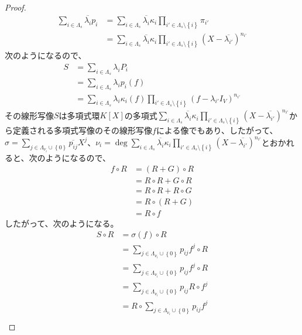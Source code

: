 \documentclass[dvipdfmx]{jsarticle}
\begin{document}
\begin{proof}
\begin{align*}
\sum_{i \in \varLambda_{s}} {\overline{\lambda_{i}}p_{i}} &= \sum_{i \in \varLambda_{s}} {\overline{\lambda_{i}}\kappa_{i}\prod_{i' \in \varLambda_{s} \setminus \left\{ i \right\}} {\pi_{i'}}} \\
&= \sum_{i \in \varLambda_{s}} {\overline{\lambda_{i}}\kappa_{i}\prod_{i' \in \varLambda_{s} \setminus \left\{ i \right\}} \left( X - \overline{\lambda_{i'}} \right)^{n_{i'}}}
\end{align*}
次のようになるので、
\begin{align*}
S &= \sum_{i \in \varLambda_{s}} {\lambda_{i}P_{i}} \\
&= \sum_{i \in \varLambda_{s}} {\lambda_{i}p_{i}(f)} \\
&= \sum_{i \in \varLambda_{s}} {\lambda_{i}\kappa_{i}(f)\prod_{i' \in \varLambda_{s} \setminus \left\{ i \right\}} \left( f - \lambda_{i'}I_{V} \right)^{n_{i'}}}
\end{align*}
その線形写像$S$は多項式環$K[X]$の多項式$\sum_{i \in \varLambda_{s}} {\overline{\lambda_{i}}\kappa_{i}\prod_{i' \in \varLambda_{s} \setminus \left\{ i \right\}} \left( X - \overline{\lambda_{i'}} \right)^{n_{i'}}}$から定義される多項式写像のその線形写像$f$による像でもあり、したがって、$\sigma = \sum_{j \in \varLambda_{\nu_{i}} \cup \left\{ 0 \right\}} {\overline{p_{ij}}X^{j}}$、$\nu_{i} = \deg{\sum_{i \in \varLambda_{s}} {\overline{\lambda_{i}}\kappa_{i}\prod_{i' \in \varLambda_{s} \setminus \left\{ i \right\}} \left( X - \overline{\lambda_{i'}} \right)^{n_{i'}}}}$とおかれると、次のようになるので、
\begin{align*}
f \circ R &= (R + G) \circ R \\
&= R \circ R + G \circ R \\
&= R \circ R + R \circ G \\
&= R \circ (R + G) \\
&= R \circ f
\end{align*}
したがって、次のようになる。
\begin{align*}
S \circ R &= \sigma(f) \circ R \\
&= \sum_{j \in \varLambda_{\nu_{i}} \cup \left\{ 0 \right\}} {p_{ij}f^{j}} \circ R \\
&= \sum_{j \in \varLambda_{\nu_{i}} \cup \left\{ 0 \right\}} {p_{ij}f^{j} \circ R} \\
&= \sum_{j \in \varLambda_{\nu_{i}} \cup \left\{ 0 \right\}} {p_{ij}R \circ f^{j}} \\
&= R \circ \sum_{j \in \varLambda_{\nu_{i}} \cup \left\{ 0 \right\}} {p_{ij}f^{j}} \\

\end{align*}
\end{proof}
\end{document}
